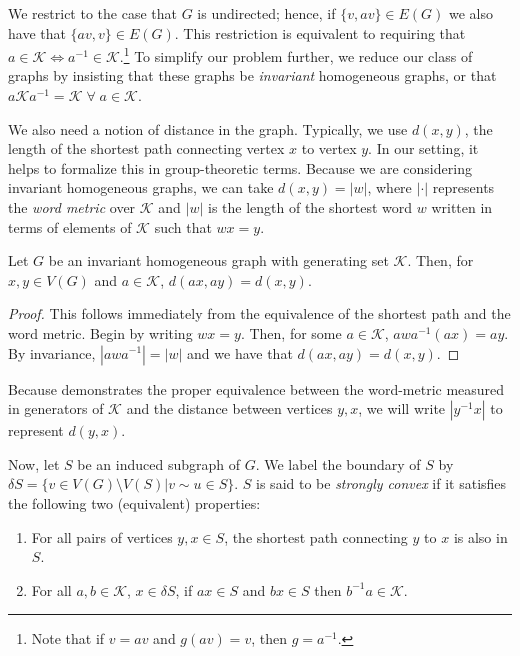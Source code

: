 We restrict to the case that $G$ is undirected; hence, if $\{v,av\} \in E(G)$ we also have that $\{av, v\} \in E(G)$. This restriction is equivalent to requiring that $a \in \mathcal{K} \iff a^{-1} \in \mathcal{K}$.\footnote{Note that if $v = a v$ and $g(av) = v$, then $g = a^{-1}$.} To simplify our problem further, we reduce our class of graphs by insisting that these graphs be \textit{invariant} homogeneous graphs, or that $a \mathcal{K} a^{-1} = \mathcal{K} \; \forall \; a \in \mathcal{K}$.

We also need a notion of distance in the graph. Typically, we use $d(x,y)$, the length of the shortest path connecting vertex $x$ to vertex $y$. In our setting, it helps to formalize this in group-theoretic terms. Because we are considering invariant homogeneous graphs, we can take $d(x,y)=|w|$, where $|\cdot|$ represents the \textit{word metric} over $\mathcal{K}$ and $|w|$ is the length of the shortest word $w$ written in terms of elements of $\mathcal{K}$ such that $w x = y$. 

\begin{lem}\label{prop:sp1}
	Let $G$ be an invariant homogeneous graph with generating set $\mathcal{K}$. Then, for $x,y \in V(G)$ and $a \in \mathcal{K}$, $d(ax,ay)=d(x,y)$.
\end{lem}
\begin{proof}
	This follows immediately from the equivalence of the shortest path and the word metric. Begin by writing $w x = y$. Then, for some $a \in \mathcal{K}$, $a w a^{-1} (a x) = a y$. By invariance, $|a w a^{-1}| = |w|$ and we have that $d(ax,ay)=d(x,y)$. 
\end{proof}
Because  demonstrates the proper equivalence between the word-metric measured in generators of $\mathcal{K}$ and the distance between vertices $y,x$, we will write $|y^{-1}x|$ to represent $d(y,x)$.

Now, let $S$ be an induced subgraph of $G$. We label the boundary of $S$ by $\delta S = \{v \in V(G) \setminus V(S) | v\sim u \in S \}$. $S$ is said to be \textit{strongly convex} if it satisfies the following two (equivalent) properties:

\begin{enumerate}
\item For all pairs of vertices $y,x \in S$, the shortest path connecting $y$ to $x$ is also in $S$.
\item For all $a,b \in \mathcal{K}$, $x \in \delta S$, if $ax \in S$ and $b x \in S$ then $b^{-1}a  \in \mathcal{K}$.\cite{Chung1994}
\end{enumerate}

